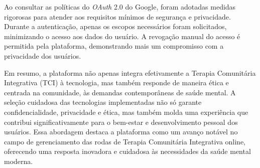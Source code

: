         Ao consultar as políticas do \textit{OAuth} 2.0 do Google, foram adotadas medidas rigorosas para atender aos requisitos mínimos de segurança e privacidade. Durante a autenticação, apenas os escopos necessários foram solicitados, minimizando o acesso aos dados do usuário. A revogação manual do acesso é permitida pela plataforma, demonstrando mais um compromisso com a privacidade dos usuários\cite{OAUTHSCOPES}.
        
        Em resumo, a plataforma não apenas integra efetivamente a Terapia Comunitária Integrativa (TCI) à tecnologia, mas também responde de maneira ética e centrada na comunidade, às demandas contemporâneas de saúde mental. A seleção cuidadosa das tecnologias implementadas não só garante confidencialidade, privacidade e ética, mas também molda uma experiência que contribui significativamente para o bem-estar e desenvolvimento pessoal dos usuários. Essa abordagem destaca a plataforma como um avanço notável no campo de gerenciamento das rodas de Terapia Comunitária Integrativa online, oferecendo uma resposta inovadora e cuidadosa às necessidades da saúde mental moderna.